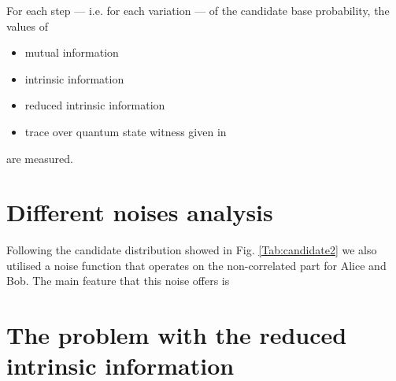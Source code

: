     For each step --- i.e. for each variation --- of the candidate base probability, the values of 
    \begin{itemize}
    	\item	mutual information
    	\item	intrinsic information
    	\item	reduced intrinsic information
    	\item	trace over quantum state witness given in \cite{DPS04}
    \end{itemize}
    are measured.
\section{Different noises analysis}
	Following the candidate distribution showed in Fig. \ref{Tab:candidate2} we also utilised a noise function that operates on the non-correlated part for Alice and Bob.
	The main feature that this noise offers is 
	\begin{figure}
		\begin{subfigure}{0.5\textwidth}
			
		\end{subfigure}
		\begin{subfigure}{0.5\textwidth}
			
		\end{subfigure}
	\end{figure}
\section{The problem with the reduced intrinsic information}
    